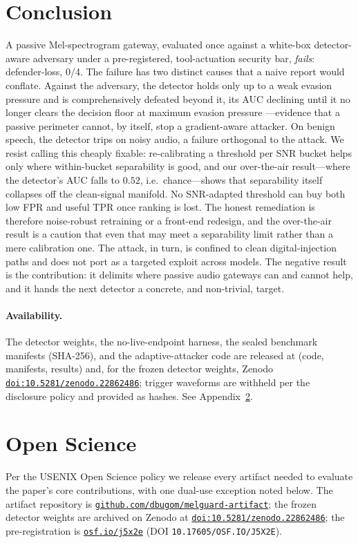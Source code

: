 \documentclass[letterpaper,twocolumn,10pt]{article}
\newif\ifanonymous\anonymousfalse
\newcommand{\zenodonum}{22862486}
\newcommand{\artifactrepo}{\href{https://github.com/dbugom/melguard-artifact}{\texttt{github.com/dbugom/melguard-artifact}}}
\newcommand{\zenodolink}{\href{https://doi.org/10.5281/zenodo.\zenodonum}{\texttt{doi:10.5281/zenodo.\zenodonum}}}
\newcommand{\osflink}{\href{https://osf.io/j5x2e}{\texttt{osf.io/j5x2e}}}
\newcommand{\osfdoi}{10.17605/OSF.IO/J5X2E}
\begin{document}
\section{Conclusion}
A passive Mel-spectrogram gateway, evaluated once against a white-box
detector-aware adversary under a pre-registered, tool-actuation security bar,
\emph{fails}: defender-loss, 0/4. The failure has two distinct causes that a
naive report would conflate. Against the adversary, the detector holds only up to
a weak evasion pressure and is comprehensively defeated beyond it, its AUC
declining until it no longer clears the decision floor at maximum evasion pressure
---evidence that a passive perimeter cannot, by itself, stop a gradient-aware
attacker. On benign speech, the detector trips on noisy audio, a failure orthogonal
to the attack. We resist calling this cheaply fixable: re-calibrating a threshold
per SNR bucket helps only where within-bucket separability is good, and our
over-the-air result---where the detector's AUC falls to $0.52$, i.e.\ chance---shows
that separability itself collapses off the clean-signal manifold. No SNR-adapted
threshold can buy both low FPR and useful TPR once ranking is lost. The honest
remediation is therefore noise-robust retraining or a front-end redesign, and the
over-the-air result is a caution that even that may meet a separability limit rather
than a mere calibration one. The attack, in turn, is confined to clean
digital-injection paths and does not port as a targeted exploit across models. The
negative result is the contribution: it delimits where passive audio gateways can
and cannot help, and it hands the next detector a concrete, and non-trivial, target.

\paragraph{Availability.} The detector weights, the no-live-endpoint harness, the
sealed benchmark manifests (SHA-256), and the adaptive-attacker code are released at
\ifanonymous \texttt{anonymous.4open.science/r/melguard-SEC27} (anonymous review copy)
\else \artifactrepo{} (code, manifests, results) and, for the frozen detector
weights, Zenodo \zenodolink\fi; trigger waveforms are withheld
per the disclosure policy and provided as hashes. See Appendix~\ref{sec:openscience}.

{\footnotesize}

\appendix

\section{Open Science}
\label{sec:openscience}
Per the USENIX Open Science policy we release every artifact needed to evaluate the
paper's core contributions, with one dual-use exception noted below.
\ifanonymous For anonymous review the artifacts are mirrored at
\texttt{anonymous.4open.science/r/melguard-SEC27} with no tracking and no identifying
metadata; the non-anonymous, stable link will appear in the camera-ready.
\else The artifact repository is \artifactrepo; the frozen detector weights are
archived on Zenodo at \zenodolink; the pre-registration is \osflink{} (DOI
\texttt{\osfdoi}).\fi
\end{document}
